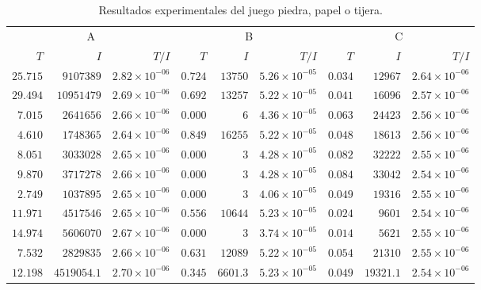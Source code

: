 \begin{table}[h]
    \centering
    \caption{Resultados experimentales del juego piedra, papel o tijera.}
    \label{tab:resultados-RPS}
    \scriptsize
    \begin{tabular}{r r r r r r r r r}
    \toprule
    \multicolumn{3}{c}{A} & \multicolumn{3}{c}{B} & \multicolumn{3}{c}{C} \\ \cmidrule(r){1-3} \cmidrule(lr){4-6} \cmidrule(l){7-9}
    $T$ & $I$ & $T/I$ & $T$ & $I$ & $T/I$ & $T$ & $I$ & $T/I$ \\ \cmidrule(r){1-3} \cmidrule(lr){4-6} \cmidrule(l){7-9}
    $25.715$ & $9107389$ & $2.82 {\times} 10^{-06}$ & $0.724$ & $13750$ & $5.26 {\times} 10^{-05}$ & $0.034$ & $12967$ & $2.64 {\times} 10^{-06}$ \\
    $29.494$ & $10951479$ & $2.69 {\times} 10^{-06}$ & $0.692$ & $13257$ & $5.22 {\times} 10^{-05}$ & $0.041$ & $16096$ & $2.57 {\times} 10^{-06}$ \\
    $7.015$ & $2641656$ & $2.66 {\times} 10^{-06}$ & $0.000$ & $6$ & $4.36 {\times} 10^{-05}$ & $0.063$ & $24423$ & $2.56 {\times} 10^{-06}$ \\
    $4.610$ & $1748365$ & $2.64 {\times} 10^{-06}$ & $0.849$ & $16255$ & $5.22 {\times} 10^{-05}$ & $0.048$ & $18613$ & $2.56 {\times} 10^{-06}$ \\
    $8.051$ & $3033028$ & $2.65 {\times} 10^{-06}$ & $0.000$ & $3$ & $4.28 {\times} 10^{-05}$ & $0.082$ & $32222$ & $2.55 {\times} 10^{-06}$ \\
    $9.870$ & $3717278$ & $2.66 {\times} 10^{-06}$ & $0.000$ & $3$ & $4.28 {\times} 10^{-05}$ & $0.084$ & $33042$ & $2.54 {\times} 10^{-06}$ \\
    $2.749$ & $1037895$ & $2.65 {\times} 10^{-06}$ & $0.000$ & $3$ & $4.06 {\times} 10^{-05}$ & $0.049$ & $19316$ & $2.55 {\times} 10^{-06}$ \\
    $11.971$ & $4517546$ & $2.65 {\times} 10^{-06}$ & $0.556$ & $10644$ & $5.23 {\times} 10^{-05}$ & $0.024$ & $9601$ & $2.54 {\times} 10^{-06}$ \\
    $14.974$ & $5606070$ & $2.67 {\times} 10^{-06}$ & $0.000$ & $3$ & $3.74 {\times} 10^{-05}$ & $0.014$ & $5621$ & $2.55 {\times} 10^{-06}$ \\
    $7.532$ & $2829835$ & $2.66 {\times} 10^{-06}$ & $0.631$ & $12089$ & $5.22 {\times} 10^{-05}$ & $0.054$ & $21310$ & $2.55 {\times} 10^{-06}$ \\ \cmidrule(r){1-3} \cmidrule(lr){4-6} \cmidrule(l){7-9}
    $12.198$ & $4519054.1$ & $2.70 {\times} 10^{-06}$ & $0.345$ & $6601.3$ & $5.23 {\times} 10^{-05}$ & $0.049$ & $19321.1$ & $2.54 {\times} 10^{-06}$ \\ \bottomrule
    \end{tabular}
\end{table}

